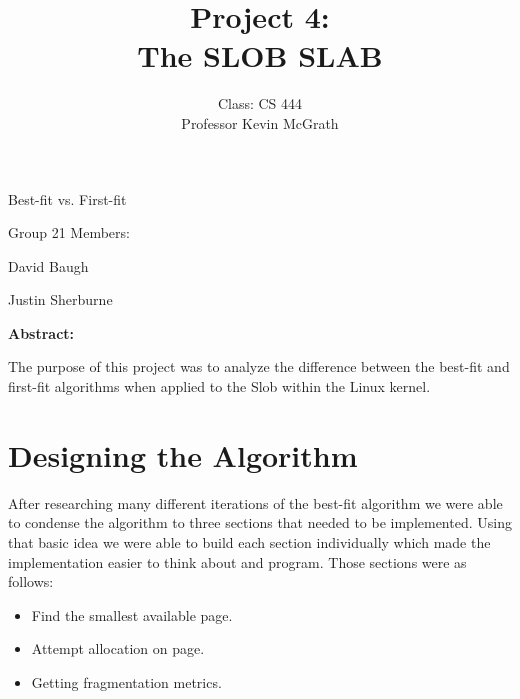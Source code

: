 \documentclass[10pt,drafclsnofoot,onecolumn]{IEEEtran}
\begin{document}
               
\begin{titlepage}
\title{\huge{Project 4:} \\ \large{The SLOB SLAB}}
\author{
	Class: CS 444 \\ Professor Kevin McGrath
}

\null  %
\nointerlineskip  %
\vfill
\let\snewpage \newpage
\let\newpage \relax
\maketitle
\begin{center}
\huge{Best-fit vs. First-fit}\par
\vspace{2mm}
\large{Group 21 Members:}\par
\normalsize{David Baugh}\par
\normalsize{Justin Sherburne}\par
\vspace{8mm}
\large{\textbf{Abstract:}}\par 
\vspace{2mm}
\normalsize{The purpose of this project was to analyze the difference between the best-fit and first-fit algorithms when applied to the Slob within the Linux kernel.}
\end{center}
\let \newpage \snewpage
\vfill 
\break %
\end{titlepage}

\section{Designing the Algorithm}
After researching many different iterations of the best-fit algorithm we were able to condense the algorithm to three sections that needed to be implemented. Using that basic idea we were able to build each section individually which made the implementation easier to think about and program. Those sections were as follows:
\begin{itemize}
\item Find the smallest available page.
\item Attempt allocation on page.
\item Getting fragmentation metrics.

\end{itemize}
\end{document}
